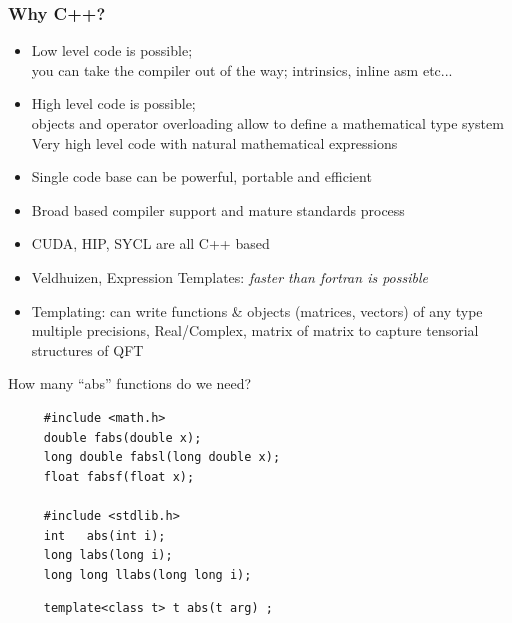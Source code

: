 \documentclass[pdf,ps,8pt]{beamer}
\begin{document}
\begin{frame}[fragile]\small\frametitle{ Why C++? }

  \begin{itemize}
  \item Low level code is possible; \\
        you can take the compiler out of the way; intrinsics, inline asm etc...
      \item High level code is possible;\\
        objects and operator overloading allow to define a mathematical type system\\
        Very high level code with natural mathematical expressions
  \item Single code base can be powerful, portable and efficient
  \item Broad based compiler support and mature standards process
  \item CUDA, HIP, SYCL are all C++ based
  \item Veldhuizen, Expression Templates: \emph{faster than fortran is possible}
  \item Templating: can write functions \& objects (matrices, vectors) of any type
    multiple precisions, Real/Complex, matrix of matrix to capture tensorial structures of QFT
  \end{itemize}

  \begin{center}
  How many ``abs'' functions do we need?
  \end{center}
  \begin{minipage}{0.5\textwidth}  
\begin{verbatim}
     #include <math.h>
     double fabs(double x);
     long double fabsl(long double x);
     float fabsf(float x);

     #include <stdlib.h>
     int   abs(int i);
     long labs(long i);
     long long llabs(long long i);
\end{verbatim}
\end{minipage}
\begin{minipage}{0.49\textwidth}  
\begin{verbatim}
     template<class t> t abs(t arg) ;
\end{verbatim}
\end{minipage}

\end{frame}
\end{document}
